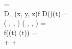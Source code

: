  =\\
D_{(x, y, z)}f \cdot D(\gamma)(t) =\\
\left(
,
,
\right)
\cdot
\left(
, , 
\right)
=\\
\nabla f(\gamma(t) \cdot \dot \gamma (t)) =\\
 \cdot {} +
 \cdot {} +
 \cdot {}